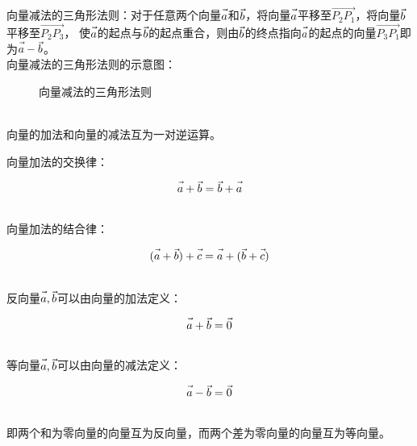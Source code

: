 \documentclass[UTF8]{ctexart}
\let\nvec\vec
\def\vec#1{\nvec{\vphantom b\smash{#1}}}
\begin{document}
    向量减法的三角形法则：对于任意两个向量$\vec{a}$和$\vec{b}$，将向量$\vec{a}$平移至$\overrightarrow{P_2P_1}$，将向量$\vec{b}$平移至$\overrightarrow{P_2P_3}$，
    使$\vec{a}$的起点与$\vec{b}$的起点重合，则由$\vec{b}$的终点指向$\vec{a}$的起点的向量$\overrightarrow{P_3P_1}$即为$\vec{a}-\vec{b}$。\\[3mm]
    向量减法的三角形法则的示意图：
    \begin{figure}[h]
        \begin{center}
            \caption{向量减法的三角形法则}
        \end{center}
    \end{figure}\\
    向量的加法和向量的减法互为一对逆运算。

\newpage

    向量加法的交换律：
    \begin{large}
        \begin{equation*}
            \vec{a}+\vec{b}=\vec{b}+\vec{a}
        \end{equation*}
    \end{large}\\
    向量加法的结合律：
    \begin{large}
        \begin{equation*}
            (\vec{a}+\vec{b})+\vec{c}=\vec{a}+(\vec{b}+\vec{c})
        \end{equation*}
    \end{large}\\
    反向量$\vec{a},\vec{b}$可以由向量的加法定义：
    \begin{large}
        \begin{equation*}
            \vec{a}+\vec{b}=\vec{0}
        \end{equation*}
    \end{large}\\
    等向量$\vec{a},\vec{b}$可以由向量的减法定义：
    \begin{large}
        \begin{equation*}
            \vec{a}-\vec{b}=\vec{0}
        \end{equation*}
    \end{large}\\
    即两个和为零向量的向量互为反向量，而两个差为零向量的向量互为等向量。\vspace{5pt}
\end{document}
